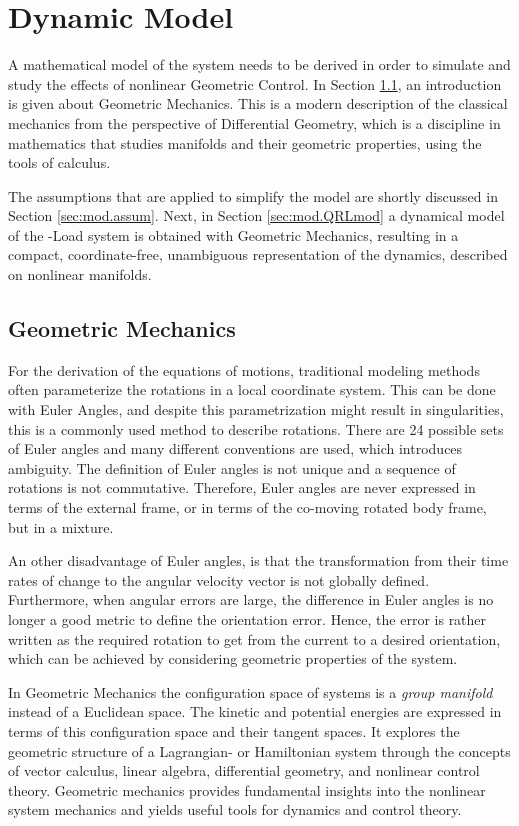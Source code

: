 \chapter{Dynamic Model} \label{ch:model}
A mathematical model of the system needs to be derived in order to simulate and study the effects of nonlinear Geometric Control. In Section \ref{sec:mod.geometric}, an introduction is given about Geometric Mechanics. This is a modern description of the classical mechanics from the perspective of Differential Geometry, which is a discipline in mathematics that studies manifolds and their geometric properties, using the tools of calculus. 

The assumptions that are applied to simplify the model are shortly discussed in Section \ref{sec:mod.assum}. Next, in Section \ref{sec:mod.QRLmod} a dynamical model of the -Load system is obtained with Geometric Mechanics, resulting in a compact, coordinate-free, unambiguous representation of the dynamics, described on nonlinear manifolds.

\section{Geometric Mechanics}\label{sec:mod.geometric}
For the derivation of the equations of motions, traditional modeling methods often parameterize the rotations in a local coordinate system. 
This can be done with Euler Angles, and despite this parametrization might result in singularities, this is a commonly used method to describe rotations. 
There are 24 possible sets of Euler angles and many different conventions are used, which introduces ambiguity. The definition of Euler angles is not unique and a sequence of rotations is not commutative. Therefore, Euler angles are never expressed in terms of the external frame, or in terms of the co-moving rotated body frame, but in a mixture.

An other disadvantage of Euler angles, is that the transformation from their time rates of change to the angular velocity vector is not globally defined. Furthermore, when angular errors are large, the difference in Euler angles is no longer a good metric to define the orientation error. 
Hence, the error is rather written as the required rotation to get from the current to a desired orientation, which can be achieved by considering geometric properties of the system.

In Geometric Mechanics the configuration space of systems is a \textit{group manifold} instead of a Euclidean space. The kinetic and potential energies are expressed in terms of this configuration space and their tangent spaces. It explores the geometric structure of a Lagrangian- or Hamiltonian system through the concepts of vector calculus, linear algebra, differential geometry, and nonlinear control theory. Geometric mechanics provides fundamental insights into the nonlinear system mechanics and yields useful tools for dynamics and control theory.

